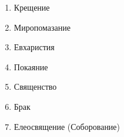 

\label{_content_vpomoch-kayuchemusya}

 

 
\begin{enumerate}

\item Крещение


\item Миропомазание


\item Евхаристия


\item Покаяние


\item Священство


\item Брак


\item Елеосвящение (Соборование)

\end{enumerate}
\mychapterending

 
